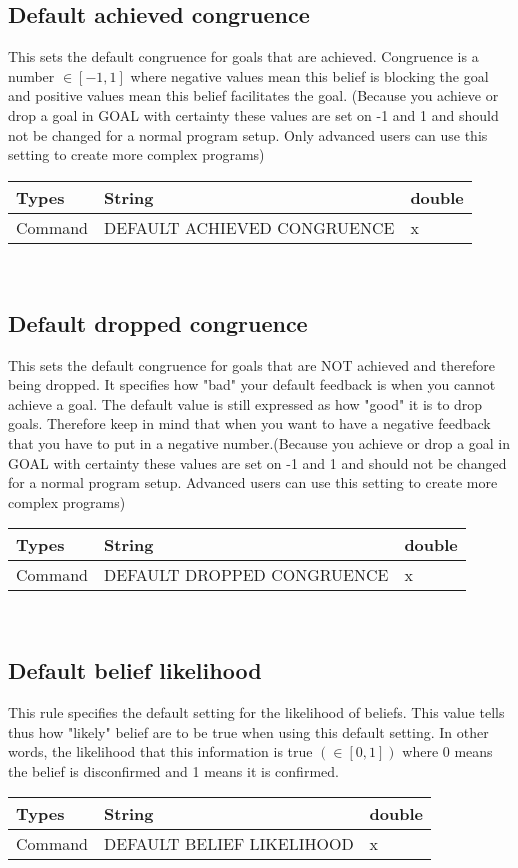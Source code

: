 \documentclass{scrartcl}
\begin{document}
\subsection{Default achieved congruence}
This sets the default congruence for goals that are achieved. Congruence is a number $\in [-1, 1]$ where negative values mean this belief is blocking the goal and positive values mean this belief facilitates the goal. (Because you achieve or drop a goal in GOAL with certainty these values are set on -1 and 1 and should not be changed for a normal program setup. Only advanced users can use this setting to create more complex programs)\\
\begin{tabular}{|l|l|l|}
	\hline  Types & String & double  \\ 
	\hline  Command & DEFAULT ACHIEVED CONGRUENCE & x  \\ 
	\hline 
\end{tabular}
\\

\subsection{Default dropped congruence}
This sets the default congruence for goals that are NOT achieved and therefore being dropped. It specifies how "bad" your default feedback is when you cannot achieve a goal. The default value is still expressed as how "good" it is to drop goals. Therefore keep in mind that when you want to have a negative feedback that you have to put in a negative number.(Because you achieve or drop a goal in GOAL with certainty these values are set on -1 and 1 and should not be changed for a normal program setup. Advanced users can use this setting to create more complex programs)\\
\begin{tabular}{|l|l|l|}
	\hline  Types & String & double  \\ 
	\hline  Command & DEFAULT DROPPED CONGRUENCE & x  \\ 
	\hline 
\end{tabular}
\\

\subsection{Default belief likelihood}
This rule specifies the default setting for the likelihood of beliefs. This value tells thus how "likely" belief are to be true when using this default setting. In other words, the likelihood that this information is true $(\in [0, 1])$ where 0 means the belief is
disconfirmed and 1 means it is confirmed.\\
\begin{tabular}{|l|l|l|}
	\hline  Types & String & double  \\ 
	\hline  Command & DEFAULT BELIEF LIKELIHOOD & x  \\ 
	\hline 
\end{tabular}
\\
\pagebreak
\end{document}
